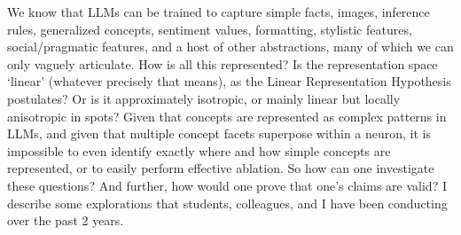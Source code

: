 We know that LLMs can be trained to capture simple facts, images, inference rules, generalized concepts, sentiment values, formatting, stylistic features, social/pragmatic features, and a host of other abstractions, many of which we can only vaguely articulate. How is all this represented? Is the representation space ‘linear’ (whatever precisely that means), as the Linear Representation Hypothesis postulates? Or is it approximately isotropic, or mainly linear but locally anisotropic in spots? Given that concepts are represented as complex patterns in LLMs, and given that multiple concept facets superpose within a neuron, it is impossible to even identify exactly where and how simple concepts are represented, or to easily perform effective ablation. So how can one investigate these questions? And further, how would one prove that one’s claims are valid? I describe some explorations that students, colleagues, and I have been conducting over the past 2 years.